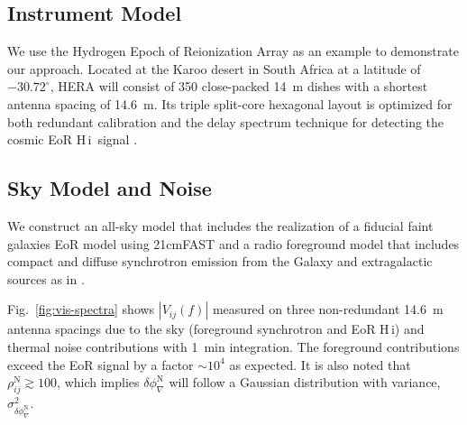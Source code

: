 \documentclass[
reprint,
superscriptaddress,
amsmath,
amssymb,
aps,
prd
]{revtex4-1}
\newcommand{\HI}{H\,{\sc i}}
\begin{document}
\subsection{Instrument Model}\label{sec:instrument}

We use the Hydrogen Epoch of Reionization Array \cite[HERA;][]{deb17,thy16,ewa16,neb16,patra17} as an example to demonstrate our approach. Located at the Karoo desert in South Africa at a latitude of $-30.72^\circ$, HERA will consist of 350 close-packed 14~m dishes with a shortest antenna spacing of 14.6~m. Its triple split-core hexagonal layout is optimized for both redundant calibration and the delay spectrum technique for detecting the cosmic EoR \HI\ signal \cite{dil16}. 

\subsection{Sky Model and Noise}\label{sec:skymodel-noise}

We construct an all-sky model that includes the realization of a fiducial {\sc faint galaxies} EoR model \cite{gre17b} using 21cmFAST \cite{mes11} and a radio foreground model that includes compact and diffuse synchrotron emission from the Galaxy and extragalactic sources as in \cite{thy15a}. 

Fig.~\ref{fig:vis-spectra} shows $|V_{ij}(f)|$ measured on three non-redundant 14.6~m antenna spacings due to the sky (foreground synchrotron and EoR \HI) and thermal noise contributions with 1~min integration. The foreground contributions exceed the EoR signal by a factor $\sim 10^4$ as expected. It is also noted that $\rho_{ij}^\textrm{N} \gtrsim 100$, which implies $\delta\phi_\nabla^\textrm{N}$ will follow a Gaussian distribution with variance, $\sigma_{\delta\phi_\nabla^\textrm{N}}^2$.
\end{document}
